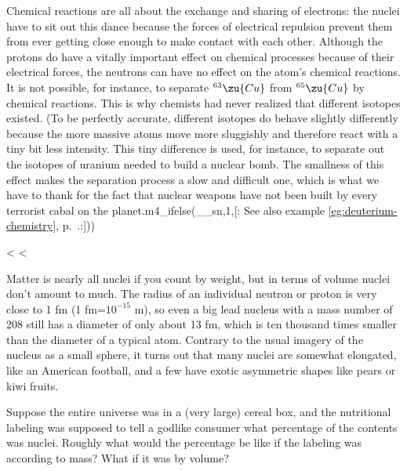         Chemical reactions are all about the exchange and sharing of
        electrons: the nuclei have to sit out this dance because the
        forces of electrical repulsion prevent them from ever
        getting close enough to make contact with each other.
        Although the protons do have a vitally important effect on
        chemical processes because of their electrical forces, the
        neutrons can have no effect on the atom's chemical
        reactions. It is not possible, for instance, to separate
        $^{63}\zu{Cu}$ from $^{65}\zu{Cu}$ by chemical reactions. This is why
        chemists had never realized that different isotopes existed.
        (To be perfectly accurate, different isotopes do behave
        slightly differently because the more massive atoms move
        more sluggishly and therefore react with a tiny bit less
        intensity. This tiny difference is used, for instance, to
        separate out the isotopes of uranium needed to build a
        nuclear bomb. The smallness of this effect makes the
        separation process a slow and difficult one, which is what
        we have to thank for the fact that nuclear weapons have not
        been built by every terrorist cabal on the planet.m4_ifelse(__sn,1,[: See also example \ref{eg:deuterium-chemistry}, 
        p.~\pageref{eg:deuterium-chemistry}.:]))

    <%
    <%

        Matter is nearly all nuclei if you count by weight, but in
        terms of volume nuclei don't amount to much. The radius of
        an individual neutron or proton is very close to 1 fm (1
        fm=$10^{-15}$  m), so even a big lead nucleus with a mass
        number of 208 still has a diameter of only about 13 fm,
        which is ten thousand times smaller than the diameter of a
        typical atom. Contrary to the usual imagery of the nucleus
        as a small sphere, it turns out that many nuclei are
        somewhat elongated, like an American football, and a few
        have exotic asymmetric shapes like pears or kiwi fruits.


\startdqs

\begin{dq}
        Suppose the entire universe was in a (very large) cereal
        box, and the nutritional labeling was supposed to tell a
        godlike consumer what percentage of the contents was nuclei.
        Roughly what would the percentage be like if the labeling
        was according to mass? What if it was by volume? 
\end{dq}


